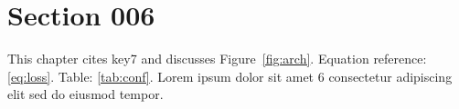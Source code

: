 \section{Section 006}\label{sec:s6}
This chapter cites key7 and discusses Figure~\ref{fig:arch}.
Equation reference: \eqref{eq:loss}. Table: \ref{tab:conf}.
Lorem ipsum dolor sit amet 6 consectetur adipiscing elit sed do eiusmod tempor.
